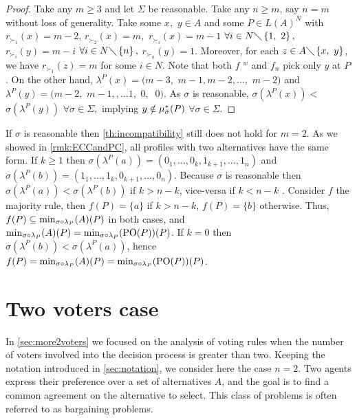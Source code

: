 \documentclass[version=3.21, pagesize, twoside=off, bibliography=totoc, DIV=calc, fontsize=12pt, a4paper]{scrartcl}
\begin{document}
	\begin{proof}
		Take any $m\geq 3$ and let $\Sigma $ be reasonable. Take any $n\geq m$, say $%
		n=m$ without loss of generality. Take some $x,$ $y\in A$ and some $P\in
		L(A)^{N}$ with $r_{\succ _{1}}(x)=m-2$, $r_{\succ _{2}}(x)=m,$ $r_{\succ
			_{i}}(x)=m-1$ $\forall i\in N\diagdown \left\{ 1,\text{ }2\right\} ,$ $%
			r_{\succ _{i}}(y)=m-i$ $\forall i\in N\diagdown \left\{ n\right\} ,$ $%
			r_{\succ _{n}}(y)=1$. Moreover, for each $z\in A\diagdown \left\{ x,\text{ }%
			y\right\} $, we have $r_{\succ _{1}}(z)=m$ for some $i\in N$. Note that both 
			$f$ $^{w}$ and $f_{n}$ pick only $y$ at $P$. On the other hand, $\lambda
			^{P}(x)=(m-3,$ $m-1,m-2,...,$ $m-2)$ and $\lambda ^{P}(y)=(m-2,$ $m-1,,...1,$
			$0,$ $\ 0)$. As $\sigma $ is reasonable, $\sigma (\lambda ^{P}(x))<$ $\sigma
			(\lambda ^{P}(y))$ $\forall \sigma \in \Sigma ,$ implying $y\notin \mu _{%
				\bar{\sigma }}^{\ast }(P)$ $\forall \sigma \in \Sigma .$
	\end{proof}

 
\begin{remark} If $\sigma$ is reasonable then \cref{th:incompatibility} still does not hold for $m=2$. As we showed in \cref{rmk:ECCandPC}, all profiles with two alternatives have the same form. If $k ≥ 1$ then $\sigma(\lambda^P(a))=(0_1, \dots, 0_k, 1_{k+1}, \dots, 1_n )$ and $\sigma(\lambda^P(b))=(1_1, \dots, 1_k, 0_{k+1}, \dots, 0_n )$. Because $\sigma$ is reasonable then $\sigma(\lambda ^{P}(a))< \sigma(\lambda ^{P}(b))$ if $k>n-k$, vice-versa if $k<n-k$ . Consider $f$ the majority rule, then $f(P)=\{a\}$ if $k>n-k$, $f(P)=\{b\}$ otherwise. Thus, $f(P)\subseteq \musigma(P)$ in both cases, and $\musigma(P)=\mustar(P)$. If $k=0$ then $\sigma(\lambda ^{P}(b))< \sigma(\lambda ^{P}(a))$, hence $f(P)=\musigma(P)=\mustar(P)$.
\end{remark}


\section{Two voters case}
In \cref{sec:more2voters} we focused on the analysis of voting rules when the number of voters involved into the decision process is greater than two. Keeping the notation introduced in \cref{sec:notation}, we consider here the case $n=2$. Two agents express their preference over a set of alternatives $A$, and the goal is to find a common agreement on the alternative to select. This class of problems is often referred to as bargaining problems.
\end{document}
